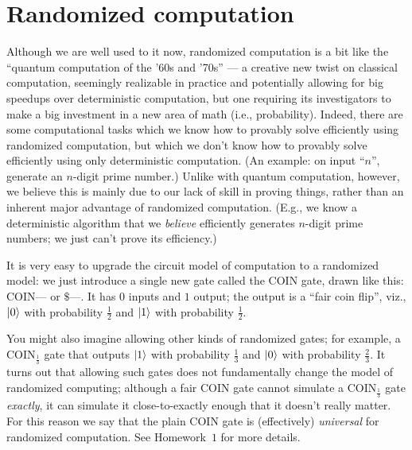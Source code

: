 \documentclass[12pt]{article}
\newcommand{\COIN}{\mathrm{COIN}}
\begin{document}
\begin{center}
\end{center}

\section{Randomized computation}

Although we are well used to it now, randomized computation is a bit like the ``quantum computation of the '60s and '70s'' --- a creative new twist on classical computation, seemingly realizable in practice and potentially allowing for big speedups over deterministic computation, but one requiring its investigators to make a big investment in a new area of math (i.e., probability).  Indeed, there are some computational tasks which we know how to provably solve efficiently using randomized computation, but which we don't know how to provably solve efficiently using only deterministic computation.  (An example: on input ``$n$'', generate an $n$-digit prime number.)  Unlike with quantum computation, however, we believe this is mainly due to our lack of skill in proving things, rather than an inherent major advantage of randomized computation.  (E.g., we know a deterministic algorithm that we \emph{believe} efficiently generates $n$-digit prime numbers; we just can't prove its efficiency.)


It is very easy to upgrade the circuit model of computation to a randomized model:  we just introduce a single new gate called the $\COIN$ gate, drawn like this: $\boxed{\COIN}$--- or $\boxed{\mathdollar}$---.  It has $0$ inputs and $1$ output; the output is a ``fair coin flip'', viz., $\ket{0}$ with probability $\frac12$ and $\ket{1}$ with probability $\frac12$.

\begin{remark}
    You might also imagine allowing other kinds of randomized gates; for example, a $\COIN_{\frac13}$ gate that outputs $\ket{1}$ with probability $\frac13$ and $\ket{0}$ with probability $\frac23$.  It turns out that allowing such gates does not fundamentally change the model of randomized computing; although a fair $\COIN$ gate cannot simulate a $\COIN_{\frac13}$ gate \emph{exactly}, it can simulate it close-to-exactly enough that it doesn't really matter.  For this reason we say that the plain $\COIN$ gate is (effectively) \emph{universal} for randomized computation.  See Homework~$1$ for more details.
\end{remark}
\end{document}

